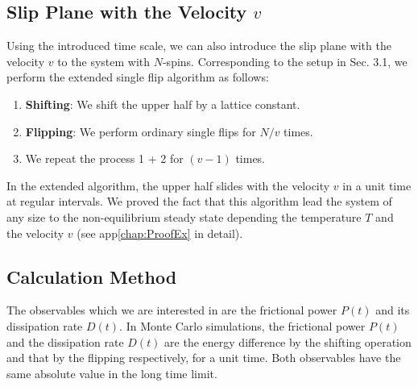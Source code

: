 \subsection{Slip Plane with the Velocity $v$}

Using the introduced time scale, we can also introduce the slip plane with the velocity $v$ to the system with $N$-spins. Corresponding to the setup in Sec. 3.1, we perform the extended single flip algorithm as follows:
\begin{enumerate}
	\item \textbf{Shifting}: We shift the upper half by a lattice constant.
	\item \textbf{Flipping}: We perform ordinary single flips for $N/v$ times.
	\item We repeat the process 1 + 2 for $(v-1)$ times.
\end{enumerate}
In the extended algorithm, the upper half slides with the velocity $v$ in a unit time at regular intervals. We proved the fact that this algorithm lead the system of any size to the non-equilibrium steady state depending the temperature $T$ and the velocity $v$ (see app\ref{chap:ProofEx} in detail).

\subsection{Calculation Method}

The observables which we are interested in are the frictional power $P(t)$ and its dissipation rate $D(t)$. In Monte Carlo simulations, the frictional power $P(t)$ and the dissipation rate $D(t)$ are the energy difference by the shifting operation and that by the flipping respectively, for a unit time. Both observables have the same absolute value in the long time limit.


